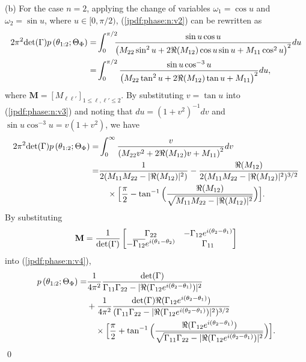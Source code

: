 \documentclass{amsart}
\begin{document}
(b) For the case $n=2$, applying the change of variables
$\omega_{1}=\cos u$ and $\omega_{2}=\sin u$, where $u\in[0,\pi/2)$,
(\ref{jpdf:phase:n:v2}) can be rewritten as
\begin{align}\notag
2\pi^{2}\textup{det}(\Gamma) p\left(\theta_{1:2};\Theta_{\Phi}\right)
=&
\int_{0}^{\pi/2}\hspace{-0.2cm}
\frac{\sin u\cos u }{\left(M_{22}\sin^{2}u+2 \Re(M_{12})\cos u \sin u+M_{11}\cos^{2}u \right)^{2}}
du
\\\label{jpdf:phase:n:v3}=&
\int_{0}^{\pi/2}
\frac{\sin u\cos^{-3}u }{\left(M_{22}\tan^{2}u+ 2 \Re(M_{12}) \tan u+M_{11} \right)^{2}}
du,
\end{align}
where $\mathbf{M}=[M_{\ell\ell'}]_{1\leq \ell,\ell'\leq 2}$.
By substituting $v = \tan u$ into (\ref{jpdf:phase:n:v3}) and noting that
$du =(1+v^2)^{-1}dv$ and $\sin u \cos^{-3}u=v(1+v^2)$, we have
\begin{align}\notag
2\pi^{2}\textup{det}(\Gamma) p\left(\theta_{1:2};\Theta_{\Phi}\right)
=&
\int_{0}^{\infty}
\frac{v}{\left( M_{22}v^2 +2 \Re(M_{12}) v+M_{11}\right)^{2}}
dv
\\\notag=&\frac{1}{2(M_{11}M_{22}-|\Re(M_{12})|^2)}
-\frac{\Re(M_{12})}{2(M_{11}M_{22}-|\Re(M_{12})|^2)^{3/2}}
\\\label{jpdf:phase:n:v4}&\ \ \ \times\Big[\frac{\pi}{2}-
\tan^{-1}\Big(\frac{\Re(M_{12})}{\sqrt{M_{11}M_{22}-|\Re(M_{12})|^2}}
\Big)\Big].
\end{align}
By substituting
\begin{align*}%
\mathbf{M}=\frac{1}{\textup{det}(\Gamma)}\begin{bmatrix} \Gamma_{22} & -\Gamma_{12}e^{i(\theta_{2}-\theta_{1})} \\
-\overline{\Gamma_{12}}e^{i(\theta_{1}-\theta_{2})} & \Gamma_{11}\end{bmatrix}
\end{align*}
into (\ref{jpdf:phase:n:v4}),
\begin{align*}
p\left(\theta_{1:2};\Theta_{\Phi}\right)
=&\frac{1 }{4\pi^{2}}\frac{\textup{det}(\Gamma)}{\Gamma_{11}\Gamma_{22}-|\Re(\Gamma_{12}e^{i(\theta_{2}-\theta_{1})})|^2}
\\\notag&+\frac{1 }{4\pi^{2}}\frac{\textup{det}(\Gamma)\Re(\Gamma_{12}e^{i(\theta_{2}-\theta_{1})})}
{(\Gamma_{11}\Gamma_{22}-|\Re(\Gamma_{12}e^{i(\theta_{2}-\theta_{1})})|^2)^{3/2}}
\\&\ \ \ \times\Big[\frac{\pi}{2}+
\tan^{-1}\Big(\frac{\Re(\Gamma_{12}e^{i(\theta_{2}-\theta_{1})})}{\sqrt{\Gamma_{11}\Gamma_{22}-|\Re(\Gamma_{12}e^{i(\theta_{2}-\theta_{1})})|^2}}
\Big)\Big].
\end{align*}
\qed
\end{document}
